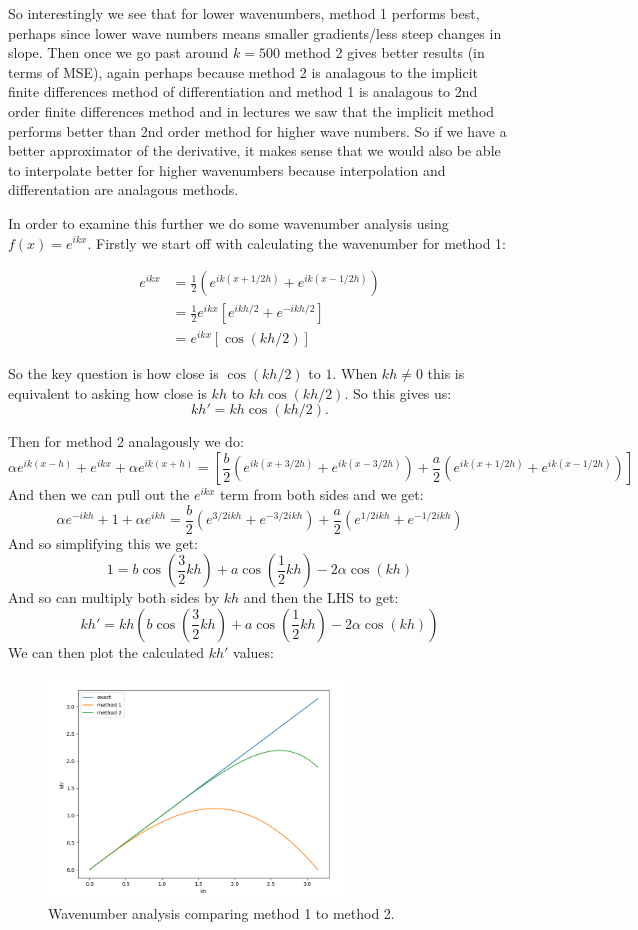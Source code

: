 \documentclass[a4paper, oneside]{book}
\begin{document}
So interestingly we see that for lower wavenumbers, method 1 performs best, perhaps
since lower wave numbers means smaller gradients/less steep changes in slope. Then once
we go past around $k=500$ method 2 gives better results (in terms of MSE), again perhaps because
method 2 is analagous to the implicit finite differences method of differentiation and
method 1 is analagous to 2nd order finite differences method and in lectures we saw that
the implicit method performs better than 2nd order method for higher wave numbers. So
if we have a better approximator of the derivative, it makes sense that we would
also be able to interpolate better for higher wavenumbers because interpolation and differentation
are analagous methods.

In order to examine this further we do some wavenumber analysis using $f(x) = e^{ikx}$.
Firstly we start off with calculating the wavenumber for method 1:

\begin{align}
e^{ikx} &= \frac{1}{2}(e^{ik(x+1/2h)} + e^{ik ( x - 1/2h)}) \\
&= \frac{1}{2} e^{ikx} [e^{ikh/2} + e^{-ikh/2}] \\
&= e^{ikx}[\cos(kh/2)]
\end{align}

So the key question is how close is $\cos(kh / 2)$ to $1$.
When $kh \neq  0$ this is equivalent to asking how close is $kh$ to  $kh \cos(kh / 2)$. So this gives us:
\[
kh' = kh \cos(kh / 2)
.\]

Then for method 2 analagously we do:
$$
\alpha e^{ik(x -h)} + e^{ikx} + \alpha e^{ik(x+h)} = \left[ \frac{b}{2} (e^{ik(x+3/2 h)} + e^{ik(x-3/2h)})  + \frac{a}{2}(e^{ik(x + 1/2h)} + e^{ik(x-1/2h)})\right]
$$
And then we can pull out the $e^{ikx}$ term from both sides and we get:
$$
\alpha e^{-ikh} + 1 + \alpha e^{ikh} = \frac{b}{2}(e^{3/2ikh} + e^{-3/2ikh}) + \frac{a}{2}(e^{1/2ikh} + e^{-1/2ikh})
$$
And so simplifying this we get:
$$
1 = b\cos\left( \frac{3}{2}kh \right) + a\cos\left( \frac{1}{2}kh \right) - 2\alpha \cos(kh)
$$
And so can multiply both sides by $kh$ and then the LHS to get:
$$
kh' = kh \left(b\cos\left( \frac{3}{2}kh \right) + a\cos\left( \frac{1}{2}kh \right) - 2\alpha \cos(kh)\right)
$$
We can then plot the calculated $kh'$ values:

\begin{figure}[htpb]
    \centering
    \includegraphics[width=0.7\textwidth]{./images/wavenumber_analysis.png}
    \caption{Wavenumber analysis comparing method 1 to method 2.}
\end{figure}
\end{document}
